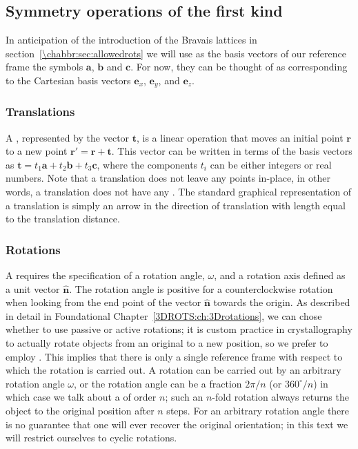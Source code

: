 \subsection{Symmetry operations of the first kind}\label{\chabbr:ssec:firstkind}

In anticipation of the introduction of the Bravais lattices in section~\ref{\chabbr:sec:allowedrots} we will use as the basis vectors of our reference frame the symbols $\mathbf{a}$, $\mathbf{b}$ and $\mathbf{c}$. For now, they can be thought of as corresponding to the Cartesian basis vectors $\mathbf{e}_x$, $\mathbf{e}_y$, and $\mathbf{e}_z$.

\subsubsection{Translations} 
A , represented by the vector $\mathbf{t}$, is a linear operation that moves an initial point $\mathbf{r}$ to a new point $\mathbf{r}'=\mathbf{r}+\mathbf{t}$.  This vector can be written in terms of the basis vectors as $\mathbf{t} = t_1\mathbf{a}+t_2\mathbf{b}+t_3\mathbf{c}$, where the components $t_i$ can be either integers or real numbers.  Note that a translation does not leave any points in-place, in other words, a translation does not have any .  The standard graphical representation of a translation is simply an arrow in the direction of translation with length equal to the translation distance.

\subsubsection{Rotations} A  requires the specification of a rotation angle, $\omega$, and a rotation axis defined as a unit vector $\hat{\mathbf{n}}$. The rotation angle is positive for a counterclockwise rotation when looking from the end point of the vector $\hat{\mathbf{n}}$ towards the origin. As described in detail in Foundational Chapter~\ref{3DROTS:ch:3Drotations}, we can chose whether to use passive or active rotations; it is custom practice in crystallography to actually rotate objects from an original to a new position, so we prefer to employ . This implies that there is only a single reference frame with respect to which the rotation is carried out.  A rotation can be carried out by an arbitrary rotation angle $\omega$, or the rotation angle can be a fraction $2\pi/n$ (or $360^{\circ}/n$) in which case we talk about a  of order $n$; such an $n$-fold rotation always returns the object to the original position after $n$ steps.  For an arbitrary rotation angle there is no guarantee that one will ever recover the original orientation; in this text we will restrict ourselves to cyclic rotations.

